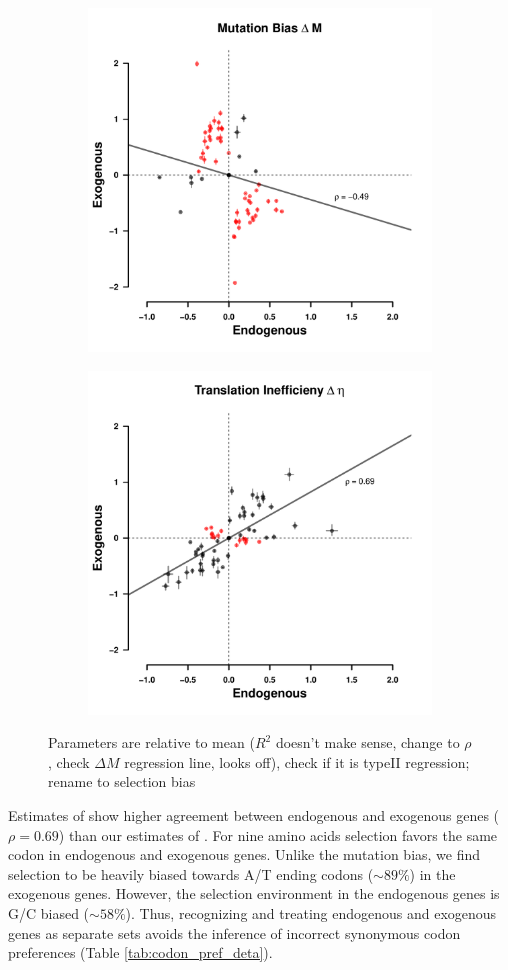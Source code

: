 \documentclass[12pt]{article}
\begin{document}
\begin{figure}[h]
    \centering
    \begin{subfigure}
        \centering
        \includegraphics[width=.45\textwidth]{img/csp_corr_dm.pdf}
    \end{subfigure}
    \begin{subfigure}
        \centering
        \includegraphics[width=.45\textwidth]{img/csp_corr_deta.pdf}
    \end{subfigure}
    \caption{Parameters are relative to mean ($R^2$ doesn't make sense, change to $\rho$, check $\Delta M$ regression line, looks off), check if it is typeII regression; rename to selection bias}
    \label{fig:csp_comp}
\end{figure}

Estimates of \DE show higher agreement between endogenous and exogenous genes ($\rho = 0.69$) than our estimates of \DM.
For nine amino acids selection favors the same codon in endogenous and exogenous genes.
Unlike the mutation bias, we find selection to be heavily biased towards A/T ending codons ($\sim 89 \%$) in the exogenous genes.
However, the selection environment in the endogenous genes is G/C biased ($\sim 58 \%$).
Thus, recognizing and treating endogenous and exogenous genes as separate sets avoids the inference of incorrect synonymous codon preferences (Table \ref{tab:codon_pref_deta}).
\end{document}

